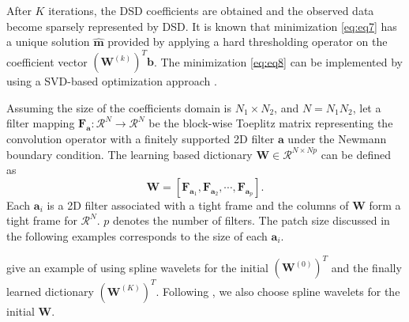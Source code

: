 After $K$ iterations, the DSD coefficients are obtained and the observed data become sparsely represented by DSD.
It is known that minimization \ref{eq:eq7} has a unique solution $\hat{\mathbf{m}}$ provided by applying a hard thresholding operator on the coefficient vector $\left(\mathbf{W}^{(k)}\right)^T\mathbf{b}$. The minimization \ref{eq:eq8} can be implemented by using a SVD-based optimization approach \cite[]{jianfeng2013}. 

Assuming the size of the coefficients domain is $N_1\times N_2$, and $N=N_1N_2$, let a filter mapping $\mathbf{F}_\mathbf{a}:\mathcal{R}^N\rightarrow \mathcal{R}^N $ be the block-wise Toeplitz matrix representing the convolution operator with a finitely supported 2D filter $\mathbf{a}$ under the Newmann boundary condition. The learning based dictionary $\mathbf{W}\in \mathcal{R} ^{N\times Np}$ can be defined as
\begin{equation}
\label{eq:Wform}
\mathbf{W} = \left[\mathbf{F}_{\mathbf{a}_1},\mathbf{F}_{\mathbf{a}_2},\cdots,\mathbf{F}_{\mathbf{a}_p}  \right].
\end{equation}
Each $\mathbf{a}_i$ is a 2D filter associated with a tight frame and the columns of $\mathbf{W}$ form a tight frame for $\mathcal{R}^N$. $p$ denotes the number of filters. The patch size discussed in the following examples corresponds to the size of each $\mathbf{a}_i$.

\cite{jianwei2014} give an example of using spline wavelets for the initial $\left(\mathbf{W}^{(0)}\right)^T$ and the finally learned dictionary $\left(\mathbf{W}^{(K)}\right)^T$. Following \cite{jianwei2014}, we also choose spline wavelets for the initial $\mathbf{W}$.

